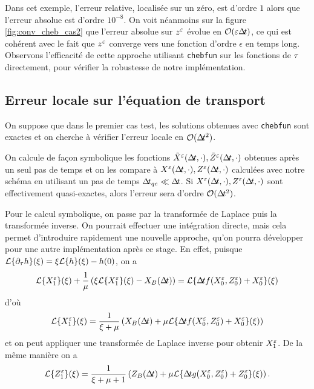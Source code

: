Dans cet exemple, l'erreur relative, localisée sur un zéro, est d'ordre $1$ alors que l'erreur absolue est d'ordre $10^{-8}$. 
On voit néanmoins sur la figure \ref{fig:conv_cheb_cas2} que l'erreur absolue sur $z^{\varepsilon}$ évolue en $\mathcal{O}(\varepsilon\Delta\!\!\!\ t)$, ce qui est cohérent avec le fait que $z^{\varepsilon}$ converge vers une fonction d'ordre $\epsilon$ en temps long. \\

Observons l'efficacité de cette approche utilisant \texttt{chebfun} sur les fonctions de $\tau$ directement, pour vérifier la robustesse de notre implémentation. 


\subsection{Erreur locale sur l'équation de transport}

On suppose que dans le premier cas test, les solutions obtenues avec \texttt{chebfun} sont exactes et on cherche à vérifier l'erreur locale en $\mathcal{O}(\Delta\!\!\!\ t^2)$.

On calcule de façon symbolique les fonctions $\tilde{X}^{\varepsilon}(\Delta\!\!\!\ t,\cdot), \tilde{Z}^{\varepsilon}(\Delta\!\!\!\ t,\cdot)$ obtenues après un seul pas de temps et on les compare à $X^{\varepsilon}(\Delta\!\!\!\ t,\cdot),Z^{\varepsilon}(\Delta\!\!\!\ t,\cdot)$ calculées avec notre schéma en utilisant un pas de temps $\Delta\!\!\!\ t_{qe} \ll \Delta\!\!\!\ t$. 
Si $X^{\varepsilon}(\Delta\!\!\!\ t,\cdot),Z^{\varepsilon}(\Delta\!\!\!\ t,\cdot)$ sont effectivement quasi-exactes, alors l'erreur sera d'ordre $\mathcal{O}(\Delta\!\!\!\ t^2)$. 

Pour le calcul symbolique, on passe par la transformée de Laplace puis la transformée inverse. 
On pourrait effectuer une intégration directe, mais cela permet d'introduire rapidement une nouvelle approche, qu'on pourra développer pour une autre implémentation après ce stage. 
En effet, puisque $\mathcal{L}\{\partial_{\tau} h\}(\xi) = \xi \mathcal{L}\{h\}(\xi) - h(0)$, on a 
$$ \mathcal{L}\{X_1^{\varepsilon}\}(\xi) + \frac{1}{\mu} \left( \xi \mathcal{L}\{X_1^{\varepsilon}\}(\xi) - X_B(\Delta\!\!\!\ t) \right) = \mathcal{L}\{\Delta\!\!\!\ t f(X_0^{\varepsilon},Z_0^{\varepsilon}) + X_0^{\varepsilon}\}(\xi) $$
d'où 
\begin{equation} \label{eq:laplace_X}
\mathcal{L}\{X_1^{\varepsilon}\}(\xi) = \frac{1}{\xi+\mu}\left( X_B(\Delta\!\!\!\ t) + \mu\mathcal{L}\{\Delta\!\!\!\ t f(X_0^{\varepsilon},Z_0^{\varepsilon}) + X_0^{\varepsilon}\}(\xi) \right) 
\end{equation}
et on peut appliquer une transformée de Laplace inverse pour obtenir $X_1^{\varepsilon}$. De la même manière on a 
\begin{equation} \label{eq:laplace_Z}
\mathcal{L}\{Z_1^{\varepsilon}\}(\xi) = \frac{1}{\xi+\mu+1}\left( Z_B(\Delta\!\!\!\ t) + \mu\mathcal{L}\{\Delta\!\!\!\ t g(X_0^{\varepsilon},Z_0^{\varepsilon}) + Z_0^{\varepsilon}\}(\xi) \right). 
\end{equation}

